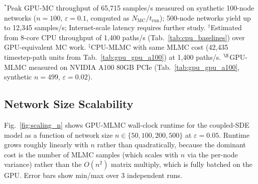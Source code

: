 \documentclass{ieeeaccess}
\begin{document}
\begin{table}[!t]
\caption{Capability Comparison Across Simulation Frameworks}
\label{tab:capability}
\centering
{}
\end{table}

\par\noindent\footnotesize $^*$Peak GPU-MC throughput of 65,715 samples/s measured on synthetic
100-node networks ($n\!=\!100$, $\varepsilon=0.1$, computed as $N_{\text{MC}}/t_{\text{run}}$);
500-node networks yield up to 12,345 samples/s; Internet-scale latency requires further study.
$^\dagger$Estimated from 8-core CPU throughput of 1,400 paths/s (Tab.~\ref{tab:cpu_baselines})
over GPU-equivalent MC work. $^\ddagger$CPU-MLMC with same MLMC cost (42,435 timestep-path units
from Tab.~\ref{tab:gpu_gpu_a100}) at 1,400 paths/s. $^\S$GPU-MLMC measured on NVIDIA A100 80GB
PCIe (Tab.~\ref{tab:gpu_gpu_a100}, synthetic $n{=}499$, $\varepsilon{=}0.02$).\normalsize

\subsection{Network Size Scalability}
\label{subsec:scaling}

Fig.~\ref{fig:scaling_n} shows GPU-MLMC wall-clock runtime for the coupled-SDE model as a
function of network size $n \in \{50, 100, 200, 500\}$ at $\varepsilon=0.05$. Runtime grows
roughly linearly with $n$ rather than quadratically, because the dominant cost is the number of
MLMC samples (which scales with $n$ via the per-node variance) rather than the $O(n^2)$ matrix
multiply, which is fully batched on the GPU. Error bars show min/max over 3 independent runs.
\end{document}
